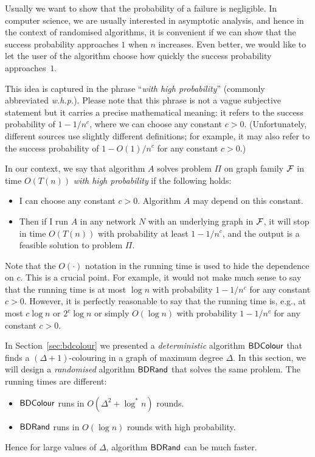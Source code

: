 Usually we want to show that the probability of a failure is negligible. In computer science, we are usually interested in asymptotic analysis, and hence in the context of randomised algorithms, it is convenient if we can show that the success probability approaches $1$ when $n$ increases. Even better, we would like to let the user of the algorithm choose how quickly the success probability approaches~$1$.

This idea is captured in the phrase ``\emph{with high probability}'' (commonly abbreviated \emph{w.h.p.}). Please note that this phrase is not a vague subjective statement but it carries a precise mathematical meaning: it refers to the success probability of $1 - 1/n^c$, where we can choose any constant $c > 0$. (Unfortunately, different sources use slightly different definitions; for example, it may also refer to the success probability of $1 - O(1)/n^c$ for any constant $c > 0$.)

In our context, we say that algorithm $A$ solves problem $\Pi$ on graph family $\mathcal{F}$ in time $O(T(n))$ \emph{with high probability} if the following holds:
\begin{itemize}
    \item I can choose any constant $c > 0$. Algorithm $A$ may depend on this constant.
    \item Then if I run $A$ in any network $N$ with an underlying graph in $\mathcal{F}$, it will stop in time $O(T(n))$ with probability at least $1 - 1/n^c$, and the output is a feasible solution to problem $\Pi$.
\end{itemize}
Note that the $O(\cdot)$ notation in the running time is used to hide the dependence on $c$. This is a crucial point. For example, it would not make much sense to say that the running time is at most $\log n$ with probability $1 - 1/n^c$ for any constant $c > 0$. However, it is perfectly reasonable to say that the running time is, e.g., at most $c \log n$ or $2^c \log n$ or simply $O(\log n)$ with probability $1 - 1/n^c$ for any constant $c > 0$.


\label{sec:bdrand}

In Section~\ref{sec:bdcolour} we presented a \emph{deterministic} algorithm $\textup{\sffamily BDColour}$ that finds a ${(\Delta+1)}$-colouring in a graph of maximum degree $\Delta$. In this section, we will design a \emph{randomised} algorithm $\textup{\sffamily BDRand}$ that solves the same problem. The running times are different:
\begin{itemize}[noitemsep]
    \item $\textup{\sffamily BDColour}$ runs in $O(\Delta^2 + \log^* n)$ rounds.
    \item $\textup{\sffamily BDRand}$ runs in $O(\log n)$ rounds with high probability.
\end{itemize}
Hence for large values of $\Delta$, algorithm $\textup{\sffamily BDRand}$ can be much faster.


